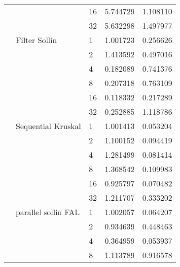 \begin{tabular}{lllrr}
                                                       &                     & 16 &  5.744729 &  1.108110 \\
                                                       &                     & 32 &  5.632298 &  1.497977 \\
                                                       & Filter Sollin & 1  &  1.001723 &  0.256626 \\
                                                       &                     & 2  &  1.413592 &  0.497016 \\
                                                       &                     & 4  &  0.182089 &  0.741376 \\
                                                       &                     & 8  &  0.207318 &  0.763109 \\
                                                       &                     & 16 &  0.118332 &  0.217289 \\
                                                       &                     & 32 &  0.252885 &  1.118786 \\
                                                       & Sequential Kruskal & 1  &  1.001413 &  0.053204 \\
                                                       &                     & 2  &  1.100152 &  0.094419 \\
                                                       &                     & 4  &  1.281499 &  0.081414 \\
                                                       &                     & 8  &  1.368542 &  0.109983 \\
                                                       &                     & 16 &  0.925797 &  0.070482 \\
                                                       &                     & 32 &  1.211707 &  0.333202 \\
                                                       & parallel sollin FAL & 1  &  1.002057 &  0.064207 \\
                                                       &                     & 2  &  0.934639 &  0.448463 \\
                                                       &                     & 4  &  0.364959 &  0.053937 \\
                                                       &                     & 8  &  1.113789 &  0.916578 \\

\end{tabular}
